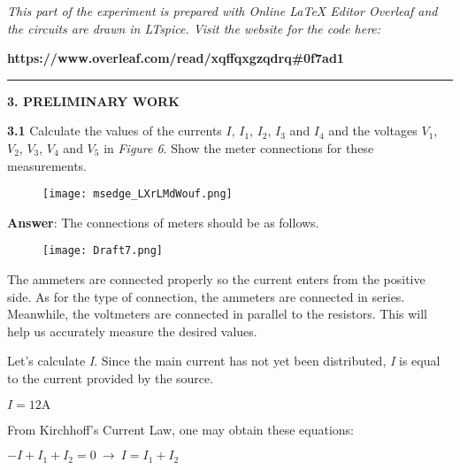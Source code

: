 \documentclass{article}
\begin{document}
{\large \textit{This part of the experiment is prepared with Online LaTeX Editor Overleaf and the circuits are drawn in LTspice. Visit the website for the code here:}}

{\large \textbf{https://www.overleaf.com/read/xqffqxgzqdrq\#0f7ad1}}
\vspace{4mm}
\hrule
\vspace{4mm}
{\textbf{\Large 3. PRELIMINARY WORK}}

\vspace{4mm}

{\Large \textbf{3.1} Calculate the values of the currents $I$, $I_{1}$, $I_{2}$, $I_{3}$ and $I_{4}$ and the voltages $V_{1}$, $V_{2}$, $V_{3}$, $V_{4}$ and $V_{5}$ in \textit{Figure 6}. Show the meter connections for these measurements.}

\begin{figure}[H]
    \centering
    \texttt{[image: msedge\_LXrLMdWouf.png]}
    \label{figure6}
\end{figure}

{\Large \textbf{Answer}: The connections of meters should be as follows.}

\begin{figure}[H]
    \centering
    \texttt{[image: Draft7.png]}
\end{figure}

\vspace{4mm}

{\Large The ammeters are connected properly so the current enters from the positive side. As for the type of connection, the ammeters are connected in series. Meanwhile, the voltmeters are connected in parallel to the resistors. This will help us accurately measure the desired values.}

{\Large  Let's calculate \textit{I}. Since the main current has not yet been distributed, \textit{I} is equal to the current provided by the source.}

\vspace{4mm}

{\Large $\boxed{I = 12 \text{A}}$}

\vspace{4mm}

{\Large From Kirchhoff's Current Law, one may obtain these equations:}

\vspace{4mm}

{\Large $-I + I_1 + I_2 = 0 \ \rightarrow \ I = I_1 + I_2 $}
\end{document}
